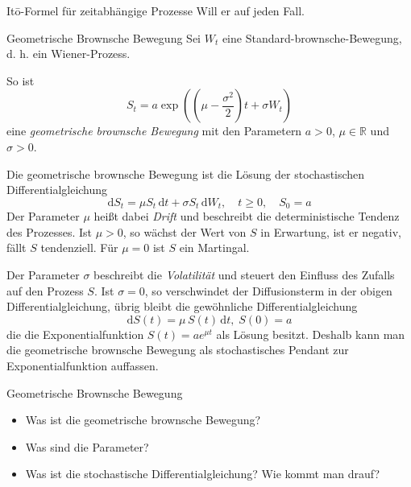 \begin{info}{Itō-Formel für zeitabhängige Prozesse}
    Will er auf jeden Fall.
\end{info}

\begin{defi}{Geometrische Brownsche Bewegung}
    Sei $W_{t}$ eine Standard-brownsche-Bewegung, d. h. ein Wiener-Prozess.

    So ist
    \[
        S_t = a \exp\left(\left(\mu - \frac{\sigma^2}{2}\right)t + \sigma W_t\right)
    \]
    eine \emph{geometrische brownsche Bewegung} mit den Parametern $a > 0$, $\mu \in \mathbb{R}$ und $\sigma > 0$.

    Die geometrische brownsche Bewegung ist die Lösung der stochastischen Differentialgleichung
    \[
        \mathrm {d} S_{t}=\mu S_{t}\,\mathrm {d} t+\sigma S_{t}\,\mathrm {d} W_{t},\quad t\geq 0,\quad S_{0}=a
    \]
    Der Parameter $\mu$ heißt dabei \emph{Drift} und beschreibt die deterministische Tendenz des Prozesses.
    Ist $\mu >0$, so wächst der Wert von $S$ in Erwartung, ist er negativ, fällt $S$ tendenziell.
    Für $\mu =0$ ist $S$ ein Martingal.

    Der Parameter $\sigma$ beschreibt die \emph{Volatilität} und steuert den Einfluss des Zufalls auf den Prozess $S$.
    Ist $\sigma =0$, so verschwindet der Diffusionsterm in der obigen Differentialgleichung, übrig bleibt die gewöhnliche Differentialgleichung
    \[
        \mathrm {d} S(t)=\mu \,S(t)\,\mathrm {d} t,\;S(0)=a
    \]
    die die Exponentialfunktion $S(t)=ae^{\mu t}$ als Lösung besitzt.
    Deshalb kann man die geometrische brownsche Bewegung als stochastisches Pendant zur Exponentialfunktion auffassen.
\end{defi}

\begin{info}{Geometrische Brownsche Bewegung}
    \begin{itemize}
        \item Was ist die geometrische brownsche Bewegung?
        \item Was sind die Parameter?
        \item Was ist die stochastische Differentialgleichung? Wie kommt man drauf?
    \end{itemize}
\end{info}
